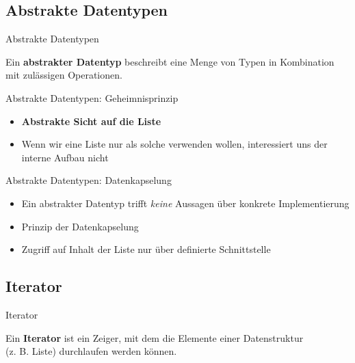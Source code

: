 \documentclass[18pt]{beamer}
\begin{document}
\subsection{Abstrakte Datentypen}

\begin{frame}{Abstrakte Datentypen}
    \begin{block}{}
        Ein \textbf{abstrakter Datentyp} beschreibt eine Menge von Typen in Kombination mit zulässigen Operationen.
    \end{block}

\end{frame}

\begin{frame}{Abstrakte Datentypen: Geheimnisprinzip}
    \begin{itemize}
        \item \textbf{Abstrakte Sicht auf die Liste}
        \item Wenn wir eine Liste nur als solche verwenden wollen, interessiert uns der interne Aufbau nicht
    \end{itemize}

\end{frame}


\begin{frame}{Abstrakte Datentypen: Datenkapselung}
    \begin{alertblock}{}
        \begin{itemize}
            \item Ein abstrakter Datentyp trifft \textit{keine} Aussagen über konkrete Implementierung
            \item Prinzip der Datenkapselung
            \item Zugriff auf Inhalt der Liste nur über definierte Schnittstelle
        \end{itemize}
    \end{alertblock}

\end{frame}

\subsection{Iterator}


\begin{frame}{Iterator}
    \begin{block}{}
        Ein \textbf{Iterator} ist ein Zeiger, mit dem die Elemente einer Datenstruktur\\ (z. B. Liste) durchlaufen werden können.
    \end{block}

\end{frame}
\end{document}
